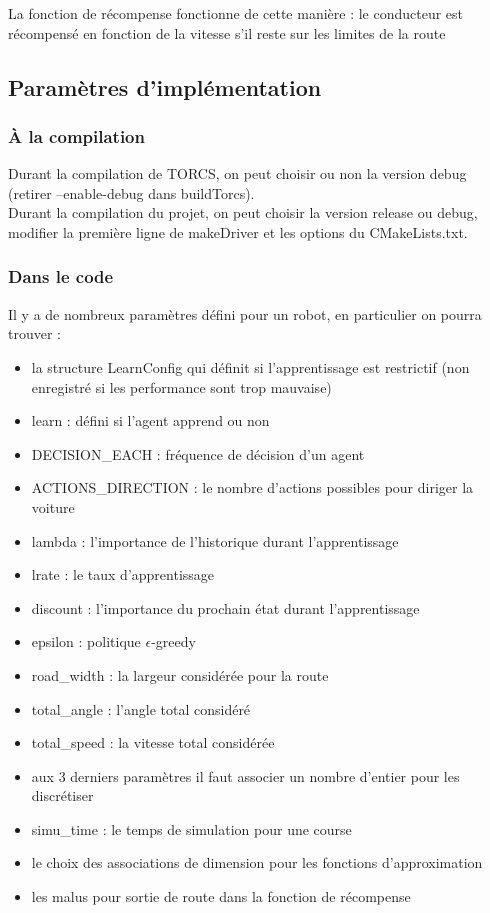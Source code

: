 \documentclass[a4paper,12pt]{article}
\begin{document}
      La fonction de récompense fonctionne de cette manière :
	  le conducteur est récompensé en fonction de la vitesse s'il reste sur les limites de la route

    \subsection{Paramètres d’implémentation}
    
    \subsubsection{À la compilation}
    Durant la compilation de TORCS, on peut choisir ou non la version debug (retirer --enable-debug dans 
    buildTorcs).\\[0.4cm]
    
    Durant la compilation du projet, on peut choisir la version release ou debug, modifier la première
    ligne de makeDriver et les options du CMakeLists.txt.

    \subsubsection{Dans le code}
  
     Il y a de nombreux paramètres défini pour un robot, en particulier on pourra trouver :
     \begin{itemize}
      \item la structure LearnConfig qui définit si l'apprentissage est restrictif (non enregistré si les 
	  performance sont trop mauvaise)
      \item learn : défini si l'agent apprend ou non
      \item DECISION\_EACH : fréquence de décision d'un agent
      \item ACTIONS\_DIRECTION : le nombre d'actions possibles pour diriger la voiture
      \item lambda : l'importance de l'historique durant l'apprentissage
      \item lrate : le taux d'apprentissage
      \item discount : l'importance du prochain état durant l'apprentissage
      \item epsilon : politique $\epsilon$-greedy
      \item road\_width : la largeur considérée pour la route
      \item total\_angle : l'angle total considéré
      \item total\_speed : la vitesse total considérée
      \item aux 3 derniers paramètres il faut associer un nombre d'entier pour les discrétiser
      \item simu\_time : le temps de simulation pour une course
      \item le choix des associations de dimension pour les fonctions d'approximation
      \item les malus pour sortie de route dans la fonction de récompense
     \end{itemize}

     
     
     
     


\end{document}
